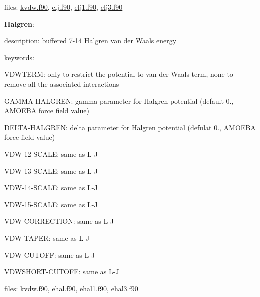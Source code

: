files\-: \hyperlink{kvdw_8f90}{kvdw.\-f90}, \hyperlink{elj_8f90}{elj.\-f90}, \hyperlink{elj1_8f90}{elj1.\-f90}, \hyperlink{elj3_8f90}{elj3.\-f90}


\begin{DoxyItemize}
\item {\bfseries Halgren}\-:
\begin{DoxyItemize}
\item description\-: buffered 7-\/14 Halgren van der Waals energy
\item keywords\-:
\begin{DoxyItemize}
\item V\-D\-W\-T\-E\-R\-M\-: only to restrict the potential to van der Waals term, none to remove all the associated interactions
\item G\-A\-M\-M\-A-\/\-H\-A\-L\-G\-R\-E\-N\-: gamma parameter for Halgren potential (default 0., A\-M\-O\-E\-B\-A force field value)
\item D\-E\-L\-T\-A-\/\-H\-A\-L\-G\-R\-E\-N\-: delta parameter for Halgren potential (defulat 0., A\-M\-O\-E\-B\-A force field value)
\item V\-D\-W-\/12-\/\-S\-C\-A\-L\-E\-: same as L-\/\-J
\item V\-D\-W-\/13-\/\-S\-C\-A\-L\-E\-: same as L-\/\-J
\item V\-D\-W-\/14-\/\-S\-C\-A\-L\-E\-: same as L-\/\-J
\item V\-D\-W-\/15-\/\-S\-C\-A\-L\-E\-: same as L-\/\-J
\item V\-D\-W-\/\-C\-O\-R\-R\-E\-C\-T\-I\-O\-N\-: same as L-\/\-J
\item V\-D\-W-\/\-T\-A\-P\-E\-R\-: same as L-\/\-J
\item V\-D\-W-\/\-C\-U\-T\-O\-F\-F\-: same as L-\/\-J
\item V\-D\-W\-S\-H\-O\-R\-T-\/\-C\-U\-T\-O\-F\-F\-: same as L-\/\-J
\end{DoxyItemize}
\end{DoxyItemize}
\end{DoxyItemize}

files\-: \hyperlink{kvdw_8f90}{kvdw.\-f90}, \hyperlink{ehal_8f90}{ehal.\-f90}, \hyperlink{ehal1_8f90}{ehal1.\-f90}, \hyperlink{ehal3_8f90}{ehal3.\-f90}


